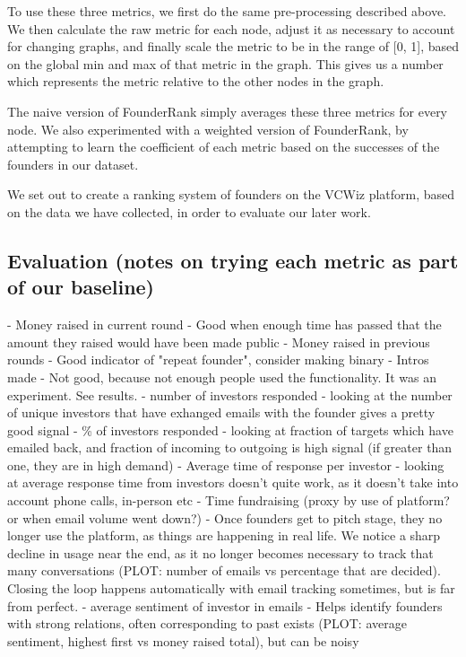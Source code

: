 To use these three metrics, we first do the same pre-processing described above. We then calculate the raw metric for each node, adjust it as necessary to account for changing graphs, and finally scale the metric to be in the range of [0, 1], based on the global min and max of that metric in the graph. This gives us a number which represents the metric relative to the other nodes in the graph.

The naive version of FounderRank simply averages these three metrics for every node. We also experimented with a weighted version of FounderRank, by attempting to learn the coefficient of each metric based on the successes of the founders in our dataset.

We set out to create a ranking system of founders on the VCWiz platform, based on the data we have collected, in order to evaluate our later work.

\subsection{Evaluation (notes on trying each metric as part of our baseline)}
- Money raised in current round
  - Good when enough time has passed that the amount they raised would have been made public
- Money raised in previous rounds
  - Good indicator of "repeat founder", consider making binary
- Intros made
  - Not good, because not enough people used the functionality. It was an experiment. See results.
- number of investors responded
  - looking at the number of unique investors that have exhanged emails with the founder gives a pretty good signal
- \% of investors responded
  - looking at fraction of targets which have emailed back, and fraction of incoming to outgoing is high signal (if greater than one, they are in high demand)
- Average time of response per investor
  - looking at average response time from investors doesn't quite work, as it doesn't take into account phone calls, in-person etc
- Time fundraising (proxy by use of platform? or when email volume went down?)
  - Once founders get to pitch stage, they no longer use the platform, as things are happening in real life. We notice a sharp decline in usage near the end, as it no longer becomes necessary to track that many conversations (PLOT: number of emails vs percentage that are decided). Closing the loop happens automatically with email tracking sometimes, but is far from perfect.
- average sentiment of investor in emails
  - Helps identify founders with strong relations, often corresponding to past exists (PLOT: average sentiment, highest first vs money raised total), but can be noisy

